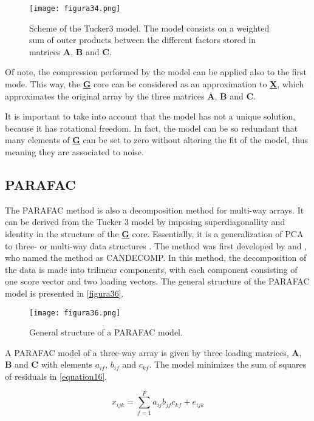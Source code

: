 \begin{figure}[hbtp]
\centering
\texttt{[image: figura34.png]}
\caption{Scheme of the Tucker3 model. The model consists on a weighted sum of outer products between the different factors stored in matrices \textbf{A}, \textbf{B} and \textbf{C}.}
\label{figura34}
\end{figure}

Of note, the compression performed by the model can be applied also to the first mode. This way, the \textbf{\underline{G}} core can be considered as an approximation to \textbf{\underline{X}}, which approximates the original array by the three matrices \textbf{A}, \textbf{B} and \textbf{C}.

It is important to take into account that the model has not a unique solution, because it has rotational freedom. In fact, the model can be so redundant that many elements of \textbf{\underline{G}} can be set to zero without altering the fit of the model, thus meaning they are associated to noise.

\subsection{PARAFAC}
The PARAFAC method is also a decomposition method for multi-way arrays. It can be derived from the Tucker 3 model by imposing superdiagonallity and identity in the structure of the \textbf{\underline{G}} core. Essentially, it is a generalization of PCA to three- or multi-way data structures \parencite{bro1997parafac}. The method was first developed by \textcite{harshman1970foundations} and \textcite{carroll1970analysis}, who named the method as CANDECOMP. In this method, the decomposition of the data is made into trilinear components, with each component consisting of one score vector and two loading vectors. The general structure of the PARAFAC model is presented in \autoref{figura36}.

\begin{figure}[hbtp]
\centering
\texttt{[image: figura36.png]}
\caption{General structure of a PARAFAC model.}
\label{figura36}
\end{figure}

A PARAFAC model of a three-way array is given by three loading matrices, \textbf{A}, \textbf{B} and \textbf{C} with elements $a_{if}$, $b_{if}$ and $c_{kf}$. The model minimizes the sum of squares of residuals in \autoref{equation16}.

\begin{equation}
x_{ijk}=\sum\limits_{f=1}^F a_{ij}b_{jf}c_{kf}+e_{ijk}
\label{equation16}
\end{equation}

